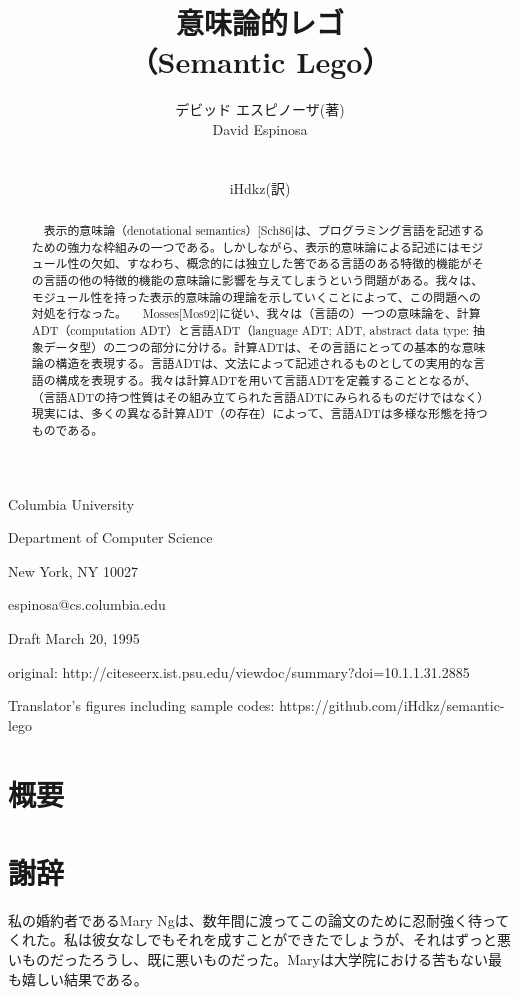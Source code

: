 \documentclass[11pt, oneside]{jsbook}   	%
\title{意味論的レゴ \\
（Semantic Lego）
}
\author{デビッド エスピノーザ(著)\\
David Espinosa\\
\\
\begin{small}
iHdkz(訳)
\end{small}
}
\date{}							%
\begin{document}
\maketitle

\begin{center}
Columbia University

Department of Computer Science

New York, NY 10027

espinosa@cs.columbia.edu

Draft March 20, 1995


original: http://citeseerx.ist.psu.edu/viewdoc/summary?doi=10.1.1.31.2885
\end{center}

Translator's figures including sample codes: https://github.com/iHdkz/semantic-lego


\newpage

\section*{概要}
\begin{abstract}
　表示的意味論（denotational semantics）[Sch86]は、プログラミング言語を記述するための強力な枠組みの一つである。しかしながら、表示的意味論による記述にはモジュール性の欠如、すなわち、概念的には独立した筈である言語のある特徴的機能がその言語の他の特徴的機能の意味論に影響を与えてしまうという問題がある。我々は、モジュール性を持った表示的意味論の理論を示していくことによって、この問題への対処を行なった。
　Mosses[Mos92]に従い、我々は（言語の）一つの意味論を、計算ADT（computation ADT）と言語ADT（language ADT; ADT, abstract data type: 抽象データ型）の二つの部分に分ける。計算ADTは、その言語にとっての基本的な意味論の構造を表現する。言語ADTは、文法によって記述されるものとしての実用的な言語の構成を表現する。我々は計算ADTを用いて言語ADTを定義することとなるが、（言語ADTの持つ性質はその組み立てられた言語ADTにみられるものだけではなく）現実には、多くの異なる計算ADT（の存在）によって、言語ADTは多様な形態を持つものである。
\end{abstract}

\newpage
\tableofcontents

\newpage
\section*{謝辞}
私の婚約者であるMary Ngは、数年間に渡ってこの論文のために忍耐強く待ってくれた。私は彼女なしでもそれを成すことができたでしょうが、それはずっと悪いものだったろうし、既に悪いものだった。Maryは大学院における苦もない最も嬉しい結果である。
\end{document}
